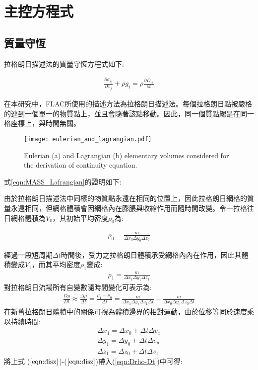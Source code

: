 \section{主控方程式}

\subsection{質量守恆}

拉格朗日描述法的質量守恆方程式如下:

\begin{align}
\frac{\partial \sigma_{ij}}{\partial x_j}+\rho g_i = \rho \frac{\partial D_{vi}}{\partial t} 
\label{eqn:MASS_Lagrangian}
\end{align}

在本研究中，FLAC所使用的描述方法為拉格朗日描述法。每個拉格朗日點被嚴格的連到一個單一的物質點上，並且會隨著該點移動。因此，同一個質點總是在同一格座標上，與時間無關。

\begin{figure*}[ht!]
    \centering
    \texttt{[image: eulerian\_and\_lagrangian.pdf]}
    \caption{ Eulerian (a) and Lagrangian (b) elementary volumes considered for the derivation of continuity equation. }
    \label{fig::Lagrangian Volume}
\end{figure*}

式\ref{eqn:MASS_Lafrangian}的證明如下:

由於拉格朗日描述法中同樣的物質點永遠在相同的位置上，因此拉格朗日網格的質量永遠相同，但網格體積會因網格內在膨脹與收縮作用而隨時間改變。令一拉格往日網格體積為$V_0$，其初始平均密度$\rho_0$為:

\begin{align}
\rho_0 = \frac{m}{\Delta x_0 \Delta y_0 \Delta z_0}
\end{align}

經過一段短周期$\Delta t$時間後，受力之拉格朗日體積承受網格內內在作用，因此其體積變成$V_1$，而其平均密度$\rho_1$變成:
\begin{align}
\rho_1 = \frac{m}{\Delta x_1 \Delta y_1 \Delta z_1}
\end{align}
對拉格朗日流場所有自變數隨時間變化可表示為:
\begin{align}
\frac{D\rho}{Dt} \approx \frac{\Delta \rho}{\Delta t} = \frac{\rho_1-\rho_0}{\Delta t}=\frac{m}{\Delta x_1 \Delta y_1 \Delta z_1\Delta t}-\frac{m}{\Delta x_0 \Delta y_0 \Delta z_0\Delta t}\label{eqn:Drho-Dt}
\end{align}
在新舊拉格朗日體積中的關係可視為體積邊界的相對運動，由於位移等同於速度乘以持續時間:
\begin{align}
\Delta x_1 = \Delta x_0+\Delta t\Delta v_x\label{eqn:disx}\\ 
\Delta y_1 = \Delta y_0+\Delta t\Delta v_y\label{eqn:disy}\\
\Delta z_1 = \Delta z_0+\Delta t\Delta v_z\label{eqn:disz}
\end{align}
將上式 ($\ref{eqn:disx}$)-($\ref{eqn:disz}$)帶入(\ref{eqn:Drho-Dt})中可得:

